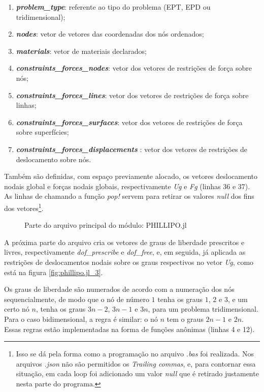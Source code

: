 \begin{enumerate}
    \item \textbf{\emph{problem\_type}}: referente ao tipo do problema (EPT, EPD ou tridimensional);
    \item \textbf{\emph{nodes}}: vetor de vetores das coordenadas dos nós ordenados;
    \item \textbf{\emph{materials}}: vetor de materiais declarados;
    \item \textbf{\emph{constraints\_forces\_nodes}}: vetor dos vetores de restrições de força sobre nós;
    \item \textbf{\emph{constraints\_forces\_lines}}: vetor dos vetores de restrições de força sobre linhas;
    \item \textbf{\emph{constraints\_forces\_surfaces}}: vetor dos vetores de restrições de força sobre superfícies;
    \item \textbf{\emph{constraints\_forces\_displacements }}: vetor dos vetores de restrições de deslocamento sobre nós.
\end{enumerate}

Também são definidas, com espaço previamente alocado, os vetores deslocamento nodais global e forças nodais globais, respectivamente \emph{Ug} e \emph{Fg} (linhas 36 e 37). As linhas de chamando a função \emph{pop!} servem para retirar os valores \emph{null} dos fins dos vetores\footnote{Isso se dá pela forma como a programação no arquivo \emph{.bas} foi realizada. Nos arquivos \emph{.json} não são permitidos os \emph{Trailing commas}, e, para contornar essa situação, em cada loop foi adicionado um valor \emph{null} que é retirado justamente nesta parte do programa.}.

\begin{figure}[hbtp]
    \caption{Parte do arquivo principal do módulo: PHILLIPO.jl}
    
    \label{fig:phillipo.jl_2}
\end{figure}

A próxima parte do arquivo cria os vetores de graus de liberdade prescritos e livres, respectivamente \emph{dof\_prescribe} e \emph{dof\_free}, e, em seguida, já aplicada as restrições de deslocamentos nodais sobre os graus respectivos no vetor \emph{Ug}, como está na figura \ref{fig:phillipo.jl_3}.

Os graus de liberdade são numerados de acordo com a numeração dos nós sequencialmente, de modo que o nó de número $1$ tenha os graus $1$, $2$ e $3$, e um certo nó $n$, tenha os graus $3n-2$, $3n-1$ e $3n$, para um problema tridimensional. Para o caso bidimensional, a regra é similar: o nó $n$ tem o graus $2n-1$ e $2n$. Essas regras estão implementadas na forma de funções anônimas (linhas 4 e 12). 

